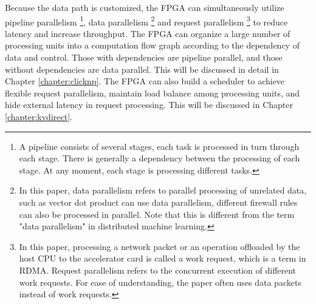 

Because the data path is customized, the FPGA can simultaneously utilize pipeline parallelism \footnote{A pipeline consists of several stages, each task is processed in turn through each stage. There is generally a dependency between the processing of each stage. At any moment, each stage is processing different tasks.}, data parallelism \footnote{In this paper, data parallelism refers to parallel processing of unrelated data, such as vector dot product can use data parallelism, different firewall rules can also be processed in parallel. Note that this is different from the term "data parallelism" in distributed machine learning.} and request parallelism \footnote{In this paper, processing a network packet or an operation offloaded by the host CPU to the accelerator card is called a work request, which is a term in RDMA. Request parallelism refers to the concurrent execution of different work requests. For ease of understanding, the paper often uses data packets instead of work requests.} to reduce latency and increase throughput.
The FPGA can organize a large number of processing units into a computation flow graph according to the dependency of data and control. Those with dependencies are pipeline parallel, and those without dependencies are data parallel. This will be discussed in detail in Chapter \ref{chapter:clicknp}.
The FPGA can also build a scheduler to achieve flexible request parallelism, maintain load balance among processing units, and hide external latency in request processing. This will be discussed in Chapter \ref{chapter:kvdirect}.

